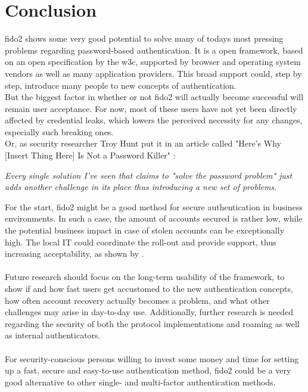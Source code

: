 
\section{Conclusion}
\label{sec:conclusion}

\ac{fido2} shows some very good potential to solve many of todays most pressing problems regarding password-based authentication. It is a open framework, based on an open specification by the \ac{w3c}, supported by browser and operating system vendors as well as many application providers. This broad support could, step by step, introduce many people to new concepts of authentication.\\
But the biggest factor in whether or not \ac{fido2} will actually become successful will remain user acceptance. For now, most of these users have not yet been directly affected by credential leaks, which lowers the perceived necessity for any changes, especially such breaking ones.\\
Or, as security researcher Troy Hunt put it in an article called "Here's Why [Insert Thing Here] Is Not a Password Killer" \cite{hunt2018a}:

\begin{displayquote}
    \emph{Every single solution I've seen that claims to "solve the password problem" just adds another challenge in its place thus introducing a new set of problems.}
\end{displayquote}

\noindent For the start, \ac{fido2} might be a good method for secure authentication in business environments. In such a case, the amount of accounts secured is rather low, while the potential business impact in case of stolen accounts can be exceptionally high. The local IT could coordinate the roll-out and provide support, thus increasing acceptability, as shown by \cite{lang2017}.\\
\\
Future research should focus on the long-term usability of the framework, to show if and how fast users get accustomed to the new authentication concepts, how often account recovery actually becomes a problem, and what other challenges may arise in day-to-day use. Additionally, further research is needed regarding the security of both the protocol implementations and roaming as well as internal authenticators.\\
\\
For security-conscious persons willing to invest some money and time for setting up a fast, secure and easy-to-use authentication method, \ac{fido2} could be a very good alternative to other single- and multi-factor authentication methods.